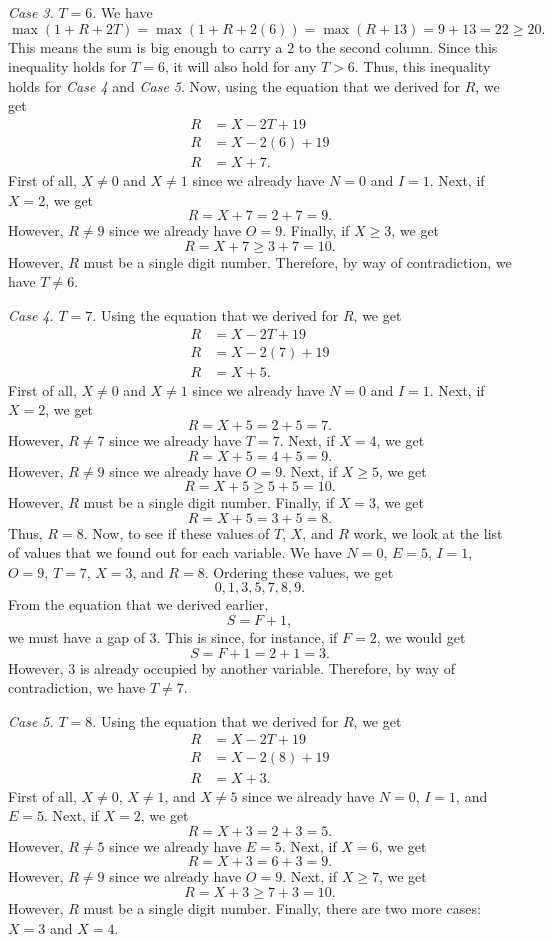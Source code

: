 \documentclass[12pt]{article}
\begin{document}
\noindent\textit{Case 3.} $T=6$. We have
\[\max(1+R+2T)=\max(1+R+2(6))=\max(R+13)=9+13=22\geq 20.\]
This means the sum is big enough to carry a $2$ to the second column. Since this inequality holds for $T=6$, it will also hold for any $T>6$. Thus, this inequality holds for \textit{Case 4} and \textit{Case 5}. Now, using the equation that we derived for $R$, we get
\begin{align*}
    R&=X-2T+19\\
    R&=X-2(6)+19\\
    R&=X+7.
\end{align*}
First of all, $X\neq 0$ and $X\neq 1$ since we already have $N=0$ and $I=1$. Next, if $X=2$, we get
\[R=X+7=2+7=9.\]
However, $R\neq 9$ since we already have $O=9$. Finally, if $X\geq 3$, we get
\[R=X+7\geq 3+7=10.\]
However, $R$ must be a single digit number. Therefore, by way of contradiction, we have $T\neq 6$.
\newpage

\noindent\textit{Case 4.} $T=7$. Using the equation that we derived for $R$, we get
\begin{align*}
    R&=X-2T+19\\
    R&=X-2(7)+19\\
    R&=X+5.
\end{align*}
First of all, $X\neq 0$ and $X\neq 1$ since we already have $N=0$ and $I=1$. Next, if $X=2$, we get
\[R=X+5=2+5=7.\]
However, $R\neq 7$ since we already have $T=7$. Next, if $X=4$, we get
\[R=X+5=4+5=9.\]
However, $R\neq 9$ since we already have $O=9$. Next, if $X\geq 5$, we get
\[R=X+5\geq 5+5=10.\]
However, $R$ must be a single digit number. Finally, if $X=3$, we get
\[R=X+5=3+5=8.\]
Thus, $R=8$. Now, to see if these values of $T$, $X$, and $R$ work, we look at the list of values that we found out for each variable. We have $N=0$, $E=5$, $I=1$, $O=9$, $T=7$, $X=3$, and $R=8$. Ordering these values, we get
\[0,1,3,5,7,8,9.\]
From the equation that we derived earlier,
\[S=F+1,\]
we must have a gap of $3$. This is since, for instance, if $F=2$, we would get \[S=F+1=2+1=3.\]
However, $3$ is already occupied by another variable. Therefore, by way of contradiction, we have $T\neq 7$.
\newpage

\noindent\textit{Case 5.} $T=8$. Using the equation that we derived for $R$, we get
\begin{align*}
    R&=X-2T+19\\
    R&=X-2(8)+19\\
    R&=X+3.
\end{align*}
First of all, $X\neq 0$, $X\neq 1$, and $X\neq 5$ since we already have $N=0$, $I=1$, and $E=5$. Next, if $X=2$, we get
\[R=X+3=2+3=5.\]
However, $R\neq 5$ since we already have $E=5$. Next, if $X=6$, we get
\[R=X+3=6+3=9.\]
However, $R\neq 9$ since we already have $O=9$. Next, if $X\geq 7$, we get
\[R=X+3\geq 7+3=10.\]
However, $R$ must be a single digit number. Finally, there are two more cases: $X=3$ and $X=4$.
\vspace{20px}
\end{document}
